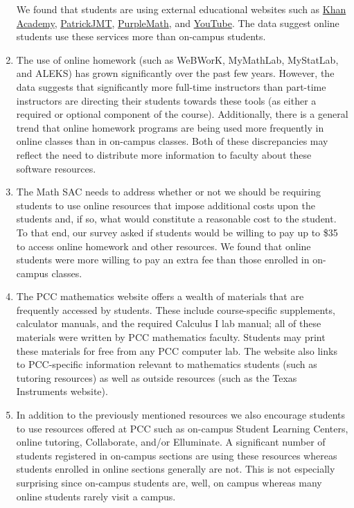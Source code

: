 \begin{enumerate}[label=Q\arabic*.,font=\bf]
	      We found that students are using external educational websites such as \href{https://www.khanacademy.org/}{Khan Academy}, \href{http://patrickjmt.com/}{PatrickJMT}, \href{http://www.purplemath.com/}{PurpleMath}, and \href{http://www.youtube.com/}{YouTube}.
	      The data suggest online students use these services more than on-campus students.
	\item The use of online homework (such as WeBWorK,  MyMathLab, MyStatLab, and ALEKS) has grown significantly over the past few years.
	      However, the data suggests that significantly more full-time instructors than part-time instructors are directing their students towards these tools (as either a required or optional component of the course).
	      Additionally, there is a general trend that online homework programs are being used more frequently in online classes than in on-campus classes.
	      Both of these discrepancies may reflect the need to distribute more information to faculty about these software resources.
	\item The Math SAC needs to address whether or not we should be requiring students to use online resources that impose additional costs upon the students and, if so, what would constitute a reasonable cost to the student.
	      To that end, our survey asked if students would be willing to pay up to \$35 to access online homework and other resources.
	      We found that online students were more willing to pay an extra fee than those enrolled in on-campus classes.
	      \setcounter{enumi}{6}
	\item The PCC mathematics website offers a wealth of materials that are frequently accessed by students.
	      These include course-specific supplements, calculator manuals, and the required Calculus I lab manual; all of these materials were written by PCC mathematics faculty.
	      Students may print these materials for free from any PCC computer lab.
	      The website also links to PCC-specific information relevant to mathematics students (such as tutoring resources) as well as outside resources (such as the Texas Instruments website).
	      \setcounter{enumi}{8}
	\item In addition to the previously mentioned resources we also encourage students to use resources offered at PCC such as on-campus Student Learning Centers, online tutoring, Collaborate, and/or Elluminate.
	      A significant number of students registered in on-campus sections are using these resources whereas students enrolled in online sections generally are not.
	      This is not especially surprising since on-campus students are, well, on campus whereas many online students rarely visit a campus.
\end{enumerate}

